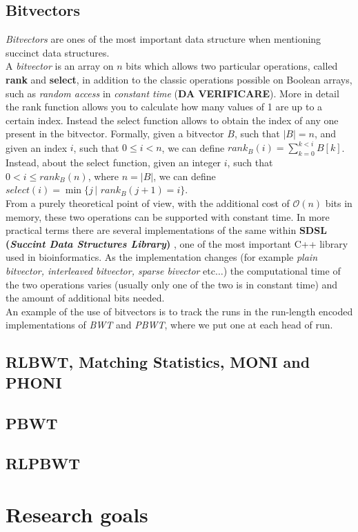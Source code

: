 \documentclass[a4paper,12pt, oneside]{article}
\begin{document}
\subsection*{Bitvectors}
\textit{Bitvectors} are ones of the most important data structure when
mentioning succinct data structures. \\
A \textit{bitvector} is an array on $n$ bits which allows two particular
operations, called \textbf{rank} and \textbf{select}, in addition to the classic
operations possible on Boolean arrays, such as \textit{random access} in
\textit{constant time} (\textbf{DA VERIFICARE}). More in detail the rank
function allows you to calculate how many values of 1 are up to a certain
index. Instead the select function allows to obtain the index of any one present
in the bitvector. Formally, given a bitvector $B$, such that $|B|=n$, and given
an index $i$, such that $0\leq i<n$, we can define $rank_B(i)=\sum_{k=0}^{k<i}
B[k]$. Instead, about the select function, given an integer $i$, such that
$0<i\leq rank_B(n)$, where $n=|B|$,  we can define $select(i)=\min\{j \,| \,\,
rank_B(j+1)=i\}$.\\
From a purely theoretical point of view, with the additional cost of
$\mathcal{O}(n)$ bits in memory, these two operations can be supported with
constant time.  In more practical terms there are several implementations of the
same within \textbf{SDSL (\textit{Succint Data Structures Library})}
\cite{sdsl}, one of the most important C++ library used in bioinformatics. As
the implementation changes (for example \textit{plain bitvector, interleaved
  bitvector, sparse bivector} etc$\ldots$) the computational time of the two
operations varies (usually only one of the two is in constant time) and the
amount of additional bits needed.\\
An example of the use of bitvectors is to track the runs in the run-length
encoded implementations of \textit{BWT} and \textit{PBWT}, where we put one at
each head of run. 
\subsection*{RLBWT, Matching Statistics, MONI and PHONI}
\subsection*{PBWT}
\subsection*{RLPBWT}
\section{Research goals}


\end{document}
